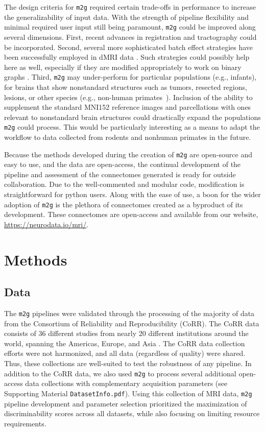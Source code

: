 The design criteria for \texttt{m2g} required certain trade-offs in performance to increase the generalizability of input data. With the strength of pipeline flexibility and minimal required user input still being paramount, \texttt{m2g} could be improved along several dimensions. First, recent advances in registration \cite{lddmm} and tractography \cite{probtrackx} could be incorporated. Second, several more sophisticated batch effect strategies have been successfully employed in dMRI data \cite{Fortin2017-dm,bridgeford_batch_paper}. Such strategies could possibly help here as well, especially if they are modified appropriately to work on binary graphs \cite{Leek2007}. Third, \texttt{m2g} may under-perform for particular populations (e.g., infants), for brains that show nonstandard structures such as tumors, resected regions, lesions, or other species (e.g., non-human primates~\cite{xu2020cross}).  Inclusion of the ability to supplement the standard MNI152 reference images and parcellations with ones relevant to nonstandard brain structures could drastically expand the populations \texttt{m2g} could process. This would be particularly interesting as a means to adapt the workflow to data collected from rodents and nonhuman primates in the future.

Because the methods developed during the creation of \texttt{m2g} are open-source and easy to use, and the data are open-access, the continual development of the pipeline and assessment of the connectomes generated is ready for outside collaboration. Due to the well-commented and modular code, modification is straightforward for python users. Along with the ease of use, a boon for the wider adoption of \texttt{m2g} is the plethora of connectomes created as a byproduct of its development. These connectomes are open-access and available from our website, \url{https://neurodata.io/mri/}.

\section{Methods}
\subsection{Data}
The \texttt{m2g} pipelines were validated through the processing of the majority of data from the Consortium of Reliability and Reproducibility (CoRR). The CoRR data consists of 36 different studies from nearly 20 different institutions around the world, spanning the Americas, Europe, and Asia \cite{corr}. The CoRR data collection efforts were not harmonized, and all data (regardless of quality) were shared. Thus, these collections are well-suited to test the robustness of any pipeline. In addition to the CoRR data, we also used \texttt{m2g} to process several additional open-access data collections with complementary acquisition parameters (see Supporting Material \texttt{DatasetInfo.pdf}).
Using this collection of MRI data, \texttt{m2g} pipeline development and parameter selection prioritized the maximization of discriminability scores across all datasets, while also focusing on limiting resource requirements.

